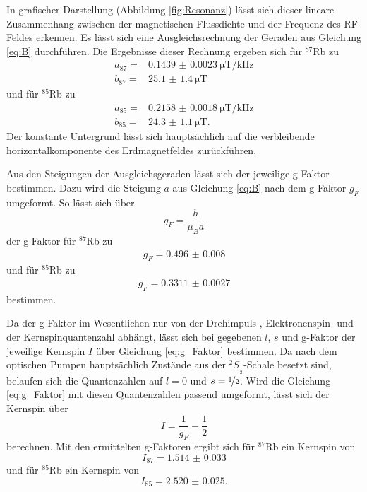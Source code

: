 In grafischer Darstellung (Abbildung \ref{fig:Resonanz}) lässt sich dieser lineare Zusammenhang zwischen der magnetischen Flussdichte und der Frequenz des RF-Feldes erkennen.
Es lässt sich eine Ausgleichsrechnung der Geraden aus Gleichung \eqref{eq:B} durchführen.
Die Ergebnisse dieser Rechnung ergeben sich für $^{87}$Rb zu  
\begin{align*}
    a_{87} = & \SI{0.1439(23)}{\micro\tesla\per\kilo\hertz} \\
    b_{87} = &\SI{25.1(14)}{\micro\tesla} 
\end{align*}
und für $^{85}$Rb zu
\begin{align*}
    a_{85} =& \SI{0.2158(18)}{\micro\tesla\per\kilo\hertz} \\
    b_{85} =&  \SI{24.3(11)}{\micro\tesla}.
\end{align*}
Der konstante Untergrund lässt sich hauptsächlich auf die verbleibende horizontalkomponente des Erdmagnetfeldes zurückführen. 



Aus den Steigungen der Ausgleichsgeraden lässt sich der jeweilige g-Faktor bestimmen.
Dazu wird die Steigung $a$ aus Gleichung \eqref{eq:B} nach dem g-Faktor $g_F$ umgeformt.
So lässt sich über
\begin{equation}
    g_F = \frac{h}{\mu_B a}
\end{equation}
der g-Faktor für $^{87}$Rb zu 
\begin{align*}
    g_F = \num{0.496(8)}
\end{align*}
und für $^{85}$Rb zu 
\begin{align*}
    g_F=\num{0.3311(27)}
\end{align*}
bestimmen.

Da der g-Faktor im Wesentlichen nur von der Drehimpuls-, Elektronenspin- und der Kernspinquantenzahl abhängt, lässt sich bei gegebenen $l$, $s$ und g-Faktor der jeweilige Kernspin $I$ über Gleichung \eqref{eq:g_Faktor} bestimmen.
Da nach dem optischen Pumpen hauptsächlich Zustände aus der $^2S_{\frac{1}{2}}$-Schale besetzt sind, belaufen sich die Quantenzahlen auf $l=0$ und $s=\nicefrac{1}{2}$.
Wird die Gleichung \eqref{eq:g_Faktor} mit diesen Quantenzahlen passend umgeformt, lässt sich der Kernspin über
\begin{equation}
    I = \frac{1}{g_F}-\frac{1}{2}
\end{equation}
berechnen.
Mit den ermittelten g-Faktoren ergibt sich für $^{87}$Rb ein Kernspin von
\begin{equation*}
    I_{87} = \num{1.514(33)}
\end{equation*}
und für $^{85}$Rb ein Kernspin von
\begin{equation*}
    I_{85} = \num{2.520(25)}. 
\end{equation*}



